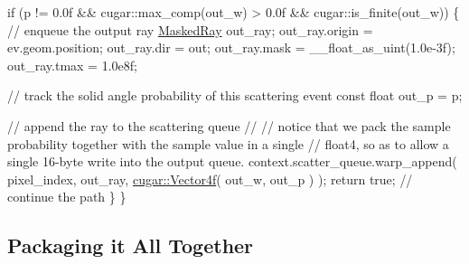 \begin{DoxyParagraph}{}
\begin{DoxyCodeInclude}
            \textcolor{keywordflow}{if} (p != 0.0f && cugar::max\_comp(out\_w) > 0.0f && cugar::is\_finite(out\_w))
            \{
                \textcolor{comment}{// enqueue the output ray}
                \hyperlink{struct_masked_ray}{MaskedRay} out\_ray;
                out\_ray.origin  = ev.geom.position;
                out\_ray.dir     = out;
                out\_ray.mask    = \_\_float\_as\_uint(1.0e-3f);
                out\_ray.tmax    = 1.0e8f;

                \textcolor{comment}{// track the solid angle probability of this scattering event}
                \textcolor{keyword}{const} \textcolor{keywordtype}{float} out\_p = p;

                \textcolor{comment}{// append the ray to the scattering queue}
                \textcolor{comment}{//}
                \textcolor{comment}{// notice that we pack the sample probability together with the sample value in a single}
                \textcolor{comment}{// float4, so as to allow a single 16-byte write into the output queue.}
                context.scatter\_queue.warp\_append( pixel\_index, out\_ray, 
      \hyperlink{structcugar_1_1_vector}{cugar::Vector4f}( out\_w, out\_p ) );
                \textcolor{keywordflow}{return} \textcolor{keyword}{true};    \textcolor{comment}{// continue the path}
            \}
        \}
\end{DoxyCodeInclude}
 
\end{DoxyParagraph}
\hypertarget{_hello_renderer_page_HelloPTPackagingAllTogetherSection}{}\subsection{Packaging it All Together}\label{_hello_renderer_page_HelloPTPackagingAllTogetherSection}
